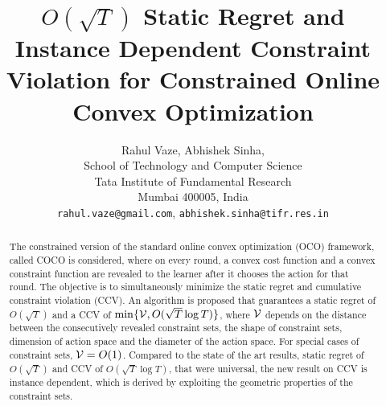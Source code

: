 \documentclass{article}
\title{$O(\sqrt{T})$ Static Regret and Instance Dependent Constraint Violation for Constrained Online Convex Optimization}
\author{%
  Rahul Vaze, Abhishek Sinha,  \\
 School of Technology and Computer Science \\
  Tata Institute of Fundamental Research \\
  Mumbai 400005, India \\
  \texttt{rahul.vaze@gmail.com},
  \texttt{abhishek.sinha@tifr.res.in}
}
\begin{document}
\maketitle
\begin{abstract} The constrained version of the standard online convex optimization (OCO) framework, called COCO is considered, where on every round, a convex cost function and a convex constraint function are revealed to the learner after it chooses the action for that round.
The objective is to simultaneously minimize the static regret and cumulative constraint violation (CCV). 
An algorithm is proposed that guarantees a static regret of $O(\sqrt{T})$ and a CCV of $\min\{\mathcal{V}, O(\sqrt{T}\log T) \}$, where $\mathcal{V}$ depends on the distance between the consecutively revealed constraint sets, the shape of constraint sets, dimension of action space and the diameter of the action space. For special cases of constraint sets, $\mathcal{V}=O(1)$. Compared to the state of the art results, static regret of $O(\sqrt{T})$ and CCV of $O(\sqrt{T}\log T)$, that were universal, the new result on CCV is instance dependent, which is derived by exploiting the geometric properties of the constraint sets.
\end{abstract}



%





%
%
 






%
\end{document}

